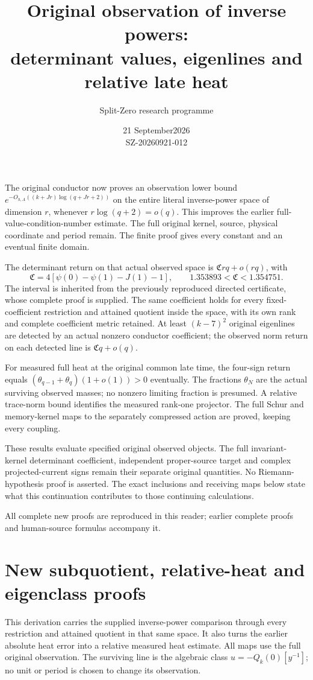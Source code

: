 \documentclass[11pt]{article}
\title{Original observation of inverse powers:\\determinant values, eigenlines and relative late heat}
\author{Split-Zero research programme}\date{21 September2026\\SZ-20260921-012}
\begin{document}
\maketitle
The original conductor now proves an observation lower bound
$e^{-O_{h,A}((k+Jr)\log(q+Jr+2))}$ on the entire literal inverse-power
space of dimension $r$, whenever $r\log(q+2)=o(q)$.
This improves the earlier full-value-condition-number estimate.
The full original kernel, source, physical coordinate and period remain.
The finite proof gives every constant and an eventual finite domain.

The determinant return on that actual observed space is
$\mathfrak C rq+o(rq)$, with
\[
\mathfrak C=4[\psi(0)-\psi(1)-J(1)-1],
\qquad1.353893<\mathfrak C<1.354751 .
\]
The interval is inherited from the previously reproduced directed
certificate, whose complete proof is supplied.
The same coefficient holds for every fixed-coefficient restriction
and attained quotient inside the space, with its own rank and
complete coefficient metric retained. At least $(k-7)^2$ original
eigenlines are detected by an actual nonzero conductor coefficient;
the observed norm return on each detected line is $\mathfrak C q+o(q)$.

For measured full heat at the original common late time,
the four-sign return equals
$(\theta_{q-1}+\theta_q)(1+o(1))>0$ eventually.
The fractions $\theta_N$ are the actual surviving observed masses;
no nonzero limiting fraction is presumed. A relative trace-norm
bound identifies the measured rank-one projector.
The full Schur and memory-kernel maps to the separately compressed
action are proved, keeping every coupling.

These results evaluate specified original observed objects.
The full invariant-kernel determinant coefficient, independent
proper-source target and complex projected-current signs remain
their separate original quantities. No Riemann-hypothesis proof
is asserted. The exact inclusions and receiving maps below state
what this continuation contributes to those continuing calculations.

All complete new proofs are reproduced in this reader; earlier
complete proofs and human-source formulas accompany it.
\tableofcontents\clearpage
\clearpage\part{New subquotient, relative-heat and eigenclass proofs}

This derivation carries the supplied inverse-power comparison through
every restriction and attained quotient in that same space. It also
turns the earlier absolute heat error into a relative measured heat
estimate. All maps use the full original observation. The surviving
line is the algebraic class $u=-Q_k(0)[y^{-1}]$; no unit or period is
chosen to change its observation.
\end{document}
